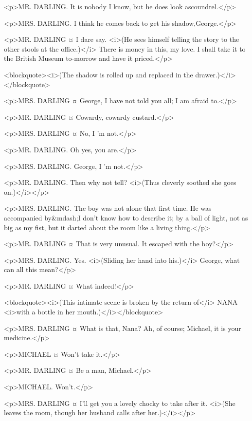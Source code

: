 <p>MR. DARLING. It is nobody I know, but he does look ascoundrel.</p>

<p>MRS. DARLING. I think he comes back to get his shadow,George.</p>

<p>MR. DARLING ¤
I dare say. <i>(He sees himself telling the story to the other stools at the office.)</i> There is money in this, my love. I shall take it to the British Museum to-morrow and have it priced.</p>

<blockquote><i>(The shadow is rolled up and replaced in the drawer.)</i></blockquote>

<p>MRS. DARLING ¤
George, I have not told you all; I am afraid to.</p>

<p>MR. DARLING ¤
Cowardy, cowardy custard.</p>

<p>MRS. DARLING ¤
No, I 'm not.</p>

<p>MR. DARLING. Oh yes, you are.</p>

<p>MRS. DARLING. George, I 'm not.</p>

<p>MR. DARLING. Then why not tell? <i>(Thus cleverly soothed she goes on.)</i></p>

<p>MRS. DARLING. The boy was not alone that first time. He was accompanied by&mdash;I don't know how to describe it; by a ball of light, not as big as my fist, but it darted about the room like a living thing.</p>

<p>MR. DARLING ¤
That is very unusual. It escaped with the boy?</p>

<p>MRS. DARLING. Yes. <i>(Sliding her hand into his.)</i> George, what can all this mean?</p>

<p>MR. DARLING ¤
What indeed!</p>

<blockquote><i>(This intimate scene is broken by the return of</i> NANA <i>with a bottle in her mouth.)</i></blockquote>

<p>MRS. DARLING ¤
What is that, Nana? Ah, of course; Michael, it is your medicine.</p>

<p>MICHAEL ¤
Won't take it.</p>

<p>MR. DARLING ¤
Be a man, Michael.</p>

<p>MICHAEL. Won't.</p>

<p>MRS. DARLING ¤
I'll get you a lovely chocky to take after it. <i>(She leaves the room, though her husband calls after her.)</i></p>

